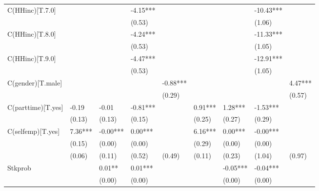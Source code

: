 \documentclass{report}
\begin{document}
\begin{table}
\begin{tabular}{lllllllll}
C(HHinc)[T.7.0]    &           &            &    -4.15*** &              &            &             &    -10.43*** &               \\
                   &           &            &      (0.53) &              &            &             &       (1.06) &               \\
C(HHinc)[T.8.0]    &           &            &    -4.24*** &              &            &             &    -11.33*** &               \\
                   &           &            &      (0.53) &              &            &             &       (1.05) &               \\
C(HHinc)[T.9.0]    &           &            &    -4.47*** &              &            &             &    -12.91*** &               \\
                   &           &            &      (0.53) &              &            &             &       (1.05) &               \\
C(gender)[T.male]  &           &            &             &     -0.88*** &            &             &              &       4.47*** \\
                   &           &            &             &       (0.29) &            &             &              &        (0.57) \\
C(parttime)[T.yes] &     -0.19 &      -0.01 &    -0.81*** &              &    0.91*** &     1.28*** &     -1.53*** &               \\
                   &    (0.13) &     (0.13) &      (0.15) &              &     (0.25) &      (0.27) &       (0.29) &               \\
C(selfemp)[T.yes]  &   7.36*** &   -0.00*** &     0.00*** &              &    6.16*** &     0.00*** &     -0.00*** &               \\
                   &    (0.15) &     (0.00) &      (0.00) &              &     (0.29) &      (0.00) &       (0.00) &               \\
                   &    (0.06) &     (0.11) &      (0.52) &       (0.49) &     (0.11) &      (0.23) &       (1.04) &        (0.97) \\
Stkprob            &           &     0.01** &     0.01*** &              &            &    -0.05*** &     -0.04*** &               \\
                   &           &     (0.00) &      (0.00) &              &            &      (0.00) &       (0.00) &               \\

\end{tabular}
\end{table}
\end{document}
